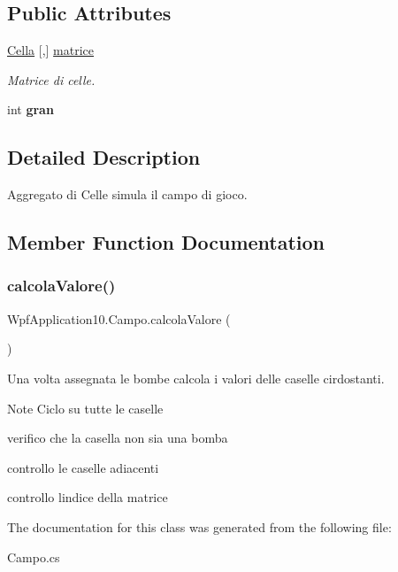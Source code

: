 \subsection*{Public Attributes}
\begin{DoxyCompactItemize}
\item 
\mbox{\label{class_wpf_application10_1_1_campo_a01b0b1aa98788bb40190d216cd91e89f}} 
\hyperlink{class_wpf_application10_1_1_cella}{Cella} \mbox{[},\mbox{]} \hyperlink{class_wpf_application10_1_1_campo_a01b0b1aa98788bb40190d216cd91e89f}{matrice}
\begin{DoxyCompactList}\small\item\em Matrice di celle. \end{DoxyCompactList}\item 
\mbox{\label{class_wpf_application10_1_1_campo_a2b85b75097ce72b3d29aacca2cb3a1f6}} 
int {\bfseries gran}
\end{DoxyCompactItemize}


\subsection{Detailed Description}
Aggregato di Celle simula il campo di gioco. 

\subsection{Member Function Documentation}
\mbox{\label{class_wpf_application10_1_1_campo_ab70e4d4a95b9d7660c361c8ab2b103fc}} 
\subsubsection{\texorpdfstring{calcola\+Valore()}{calcolaValore()}}
{\footnotesize\ttfamily Wpf\+Application10.\+Campo.\+calcola\+Valore (\begin{DoxyParamCaption}{ }\end{DoxyParamCaption})}



Una volta assegnata le bombe calcola i valori delle caselle cirdostanti. 

\begin{DoxyNote}{Note}
Ciclo su tutte le caselle

verifico che la casella non sia una bomba

controllo le caselle adiacenti

controllo l\textquotesingle{}indice della matrice 
\end{DoxyNote}


The documentation for this class was generated from the following file\+:\begin{DoxyCompactItemize}
\item 
Campo.\+cs\end{DoxyCompactItemize}
